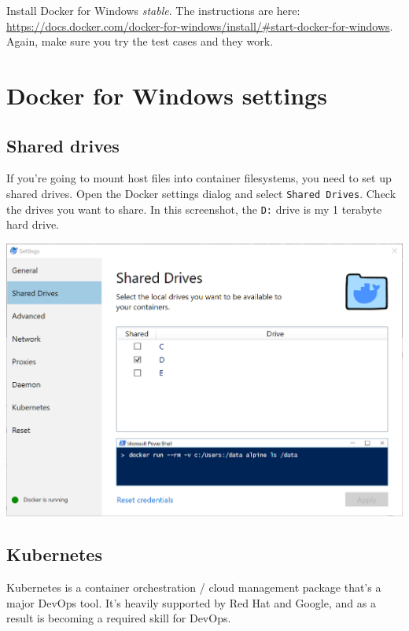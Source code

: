 \documentclass[]{book}
\theoremstyle{definition}
\theoremstyle{definition}
\theoremstyle{definition}
\theoremstyle{remark}
\begin{document}
Install Docker for Windows \emph{stable}. The instructions are here:
\url{https://docs.docker.com/docker-for-windows/install/\#start-docker-for-windows}.
Again, make sure you try the test cases and they work.

\hypertarget{docker-for-windows-settings}{%
\section{Docker for Windows
settings}\label{docker-for-windows-settings}}

\hypertarget{shared-drives}{%
\subsection{Shared drives}\label{shared-drives}}

If you're going to mount host files into container filesystems, you need
to set up shared drives. Open the Docker settings dialog and select
\texttt{Shared\ Drives}. Check the drives you want to share. In this
screenshot, the \texttt{D:} drive is my 1 terabyte hard drive.

\begin{center}\includegraphics[width=0.9\linewidth]{screenshots/2018-08-26_15_16_51-Shared_Drives} \end{center}

\hypertarget{kubernetes}{%
\subsection{Kubernetes}\label{kubernetes}}

Kubernetes is a container orchestration / cloud management package
that's a major DevOps tool. It's heavily supported by Red Hat and
Google, and as a result is becoming a required skill for DevOps.
\end{document}
